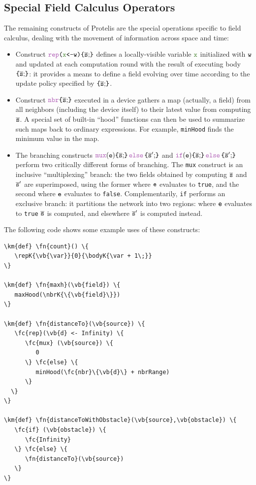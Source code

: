 \documentclass[12pt,a4paper,twoside,openright]{book}
\begin{document}
\subsection{Special Field Calculus Operators}
\label{protelis-special-operators}
The remaining constructs of Protelis are the special operations specific to field calculus, dealing with the movement of information across space and time:
\begin{itemize}
	\item Construct $\repK{\vb{\var}}{\we}{\bodyK{\overline{\s};}}$ defines a locally-visible variable $\vb{\var}$ initialized with $\texttt{w}$ and updated at each computation round with the result of executing body $\bodyK{\overline{\s};}$: it provides a means to define a field evolving over time according to the update policy specified by $\bodyK{\overline{\s};}$.
%
	\item Construct $\nbrK{\bodyK{\overline{\s};}}$ executed in a device gathers a map (actually, a field) from all neighbors (including the device itself) to their latest value from computing $\overline{\texttt{s}}$. A special set of built-in ``hood'' functions can then be used to summarize such maps back to ordinary expressions.
	For example, {\tt minHood} finds the minimum value in the map.
%
  \item The branching constructs $\muxK{\e}{\bodyK{\overline{\s};}}{\bodyK{\overline{\s}';}}$ and $\ifK{\e}{\bodyK{\overline{\s};}}{\bodyK{\overline{\s}';}}$ perform two critically different forms of branching.
%
	The {\tt mux} construct is an inclusive ``multiplexing'' branch: the two fields obtained by computing $\overline{\texttt{s}}$ and $\overline{\texttt{s}}'$ are superimposed, using the former where $\texttt{e}$ evaluates to \texttt{true}, and the second where $\texttt{e}$ evaluates to \texttt{false}.
%
	Complementarily, {\tt if} performs an exclusive branch: it partitions the network into two regions: where $\texttt{e}$ evaluates to \texttt{true} $\overline{\texttt{s}}$ is computed, and elsewhere $\overline{\texttt{s}}'$ is computed instead.
\end{itemize}

The following code shows some example uses of these constructs:

\begin{Verbatim}[samepage=true,frame=single, commandchars=\\\{\}]
\km{def} \fn{count}() \{
   \repK{\vb{\var}}{0}{\bodyK{\var + 1\;}}
\}

\km{def} \fn{maxh}(\vb{field}) \{
   maxHood(\nbrK{\{\vb{field}\}})
\}

\km{def} \fn{distanceTo}(\vb{source}) \{
   \fc{rep}(\vb{d} <- Infinity) \{
      \fc{mux} (\vb{source}) \{
         0
      \} \fc{else} \{
         minHood(\fc{nbr}\{\vb{d}\} + nbrRange)
      \}
  \}
\}

\km{def} \fn{distanceToWithObstacle}(\vb{source},\vb{obstacle}) \{
   \fc{if} (\vb{obstacle}) \{
      \fc{Infinity}
   \} \fc{else} \{
      \fn{distanceTo}(\vb{source})
   \}
\}
\end{Verbatim}
\end{document}

